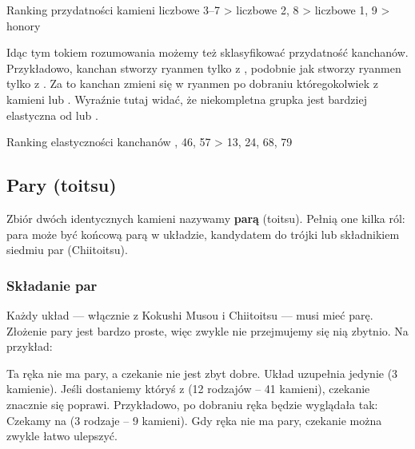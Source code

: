 \color{MyRed}
\begin{itembox}[c]{Ranking przydatności kamieni}
\centering\normalcolor
liczbowe 3--7 > liczbowe 2, 8 > liczbowe 1, 9 > honory
\end{itembox}
\normalcolor

Idąc tym tokiem rozumowania możemy też sklasyfikować przydatność {\jap kanchan}ów.
Przykładowo, {\jap kanchan}  stworzy {\jap ryanmen} tylko z , podobnie jak  stworzy {\jap ryanmen} tylko z .
Za to {\jap kanchan}  zmieni się w {\jap ryanmen} po dobraniu któregokolwiek z kamieni  lub .
Wyraźnie tutaj widać, że niekompletna grupka  jest bardziej elastyczna od  lub .

\color{MyRed}
\begin{itembox}[c]{Ranking elastyczności {\jap kanchan}ów}
\centering{}, 46, 57 > 13, 24, 68, 79
\end{itembox} 
\normalcolor
\bigskip

\subsection{Pary ({\jap toitsu})}\label{sec:closevers}
 

Zbiór dwóch identycznych kamieni nazywamy {\bf parą} ({\jap toitsu}).
Pełnią one kilka ról: para może być końcową parą w układzie, kandydatem do trójki lub składnikiem siedmiu par ({\jap Chiitoitsu}).

\bigskip
\subsubsection{Składanie par}
Każdy układ --- włącznie z {\jap Kokushi Musou} i {\jap Chiitoitsu} --- musi mieć parę.
Złożenie pary jest bardzo proste, więc zwykle nie przejmujemy się nią zbytnio.
Na przykład:
\bigskip
\begin{screen}
\end{screen}
Ta ręka nie ma pary, a czekanie nie jest zbyt dobre.
Układ uzupełnia jedynie  (3 kamienie).
Jeśli dostaniemy któryś z  (12 rodzajów -- 41 kamieni), czekanie znacznie się poprawi.
Przykładowo, po dobraniu  ręka będzie wyglądała tak:
{}
\noindent Czekamy na  (3 rodzaje -- 9 kamieni).
Gdy ręka nie ma pary, czekanie można zwykle łatwo ulepszyć.


